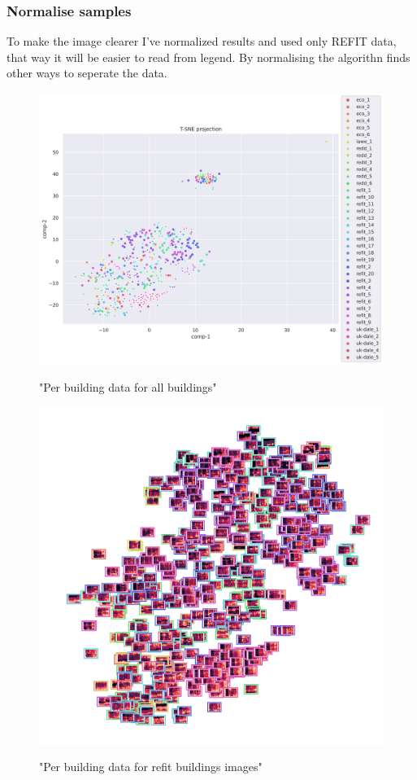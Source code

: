 \subsubsection{Normalise samples}

To make the image clearer I've normalized results and used only REFIT data, that
way it will be easier to read from legend. By normalising the algorithn
finds other ways to seperate the data.

\begin{figure}[H]
	\centering
	\caption{"Per building data for all buildings"}
	\includegraphics[width=1.2\textwidth]{Figures/TSNE/TSNE_per_building/all/scatter_all_all.png}
	\label{fig:tsne_pb_scatter_all_all}
\end{figure}

\begin{figure}[H]
	\centering
	\caption{"Per building data for refit buildings images"}
	\includegraphics[width=.9\textwidth]{Figures/TSNE/TSNE_per_building/all/img_scatter_allall.png}
	\label{fig:tsne_pb_img_scatter_allall}
\end{figure}


